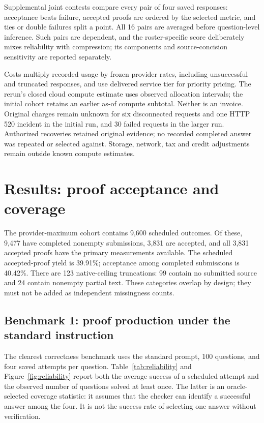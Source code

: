 \documentclass[11pt]{article}
\begin{document}
Supplemental joint contests compare every pair of four saved responses: acceptance beats failure, accepted proofs are ordered by the selected metric, and ties or double failures split a point. All 16 pairs are averaged before question-level inference. Such pairs are dependent, and the roster-specific score deliberately mixes reliability with compression; its components and source-concision sensitivity are reported separately.

Costs multiply recorded usage by frozen provider rates, including unsuccessful and truncated responses, and use delivered service tier for priority pricing. The rerun's closed cloud compute estimate uses observed allocation intervals; the initial cohort retains an earlier as-of compute subtotal. Neither is an invoice. Original charges remain unknown for six disconnected requests and one HTTP 520 incident in the initial run, and 30 failed requests in the larger run. Authorized recoveries retained original evidence; no recorded completed answer was repeated or selected against. Storage, network, tax and credit adjustments remain outside known compute estimates.


\section{Results: proof acceptance and coverage}
\label{sec:acceptance}
The provider-maximum cohort contains 9,600 scheduled outcomes. Of these, 9,477 have completed nonempty submissions, 3,831 are accepted, and all 3,831 accepted proofs have the primary measurements available. The scheduled accepted-proof yield is 39.91\%; acceptance among completed submissions is 40.42\%. There are 123 native-ceiling truncations: 99 contain no submitted source and 24 contain nonempty partial text. These categories overlap by design; they must not be added as independent missingness counts.

\subsection{Benchmark 1: proof production under the standard instruction}
The clearest correctness benchmark uses the standard prompt, 100 questions, and four saved attempts per question. Table~\ref{tab:reliability} and Figure~\ref{fig:reliability} report both the average success of a scheduled attempt and the observed number of questions solved at least once. The latter is an oracle-selected coverage statistic: it assumes that the checker can identify a successful answer among the four. It is not the success rate of selecting one answer without verification.
\end{document}

